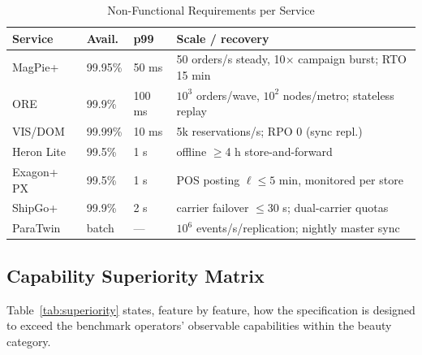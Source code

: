 \documentclass[journal]{IEEEtran}
\begin{document}
\begin{table}[!t]
\caption{Non-Functional Requirements per Service}
\label{tab:nfr}
\centering
\scriptsize
\begin{tabularx}{\columnwidth}{@{}l l l X@{}}
\toprule
\textbf{Service} & \textbf{Avail.} & \textbf{p99} & \textbf{Scale / recovery} \\
\midrule
MagPie+ & 99.95\% & 50 ms & 50 orders/s steady, 10$\times$ campaign burst; RTO 15 min \\
ORE & 99.9\% & 100 ms & $10^3$ orders/wave, $10^2$ nodes/metro; stateless replay \\
VIS/DOM & 99.99\% & 10 ms & 5k reservations/s; RPO 0 (sync repl.) \\
Heron Lite & 99.5\% & 1 s & offline $\ge$4 h store-and-forward \\
Exagon+ PX & 99.5\% & 1 s & POS posting $\ell \le 5$ min, monitored per store \\
ShipGo+ & 99.9\% & 2 s & carrier failover $\le$30 s; dual-carrier quotas \\
ParaTwin & batch & --- & $10^6$ events/s/replication; nightly master sync \\
\bottomrule
\end{tabularx}
\end{table}

\subsection{Capability Superiority Matrix}
Table~\ref{tab:superiority} states, feature by feature, how the specification is designed to exceed the benchmark operators' observable capabilities within the beauty category.
\end{document}
